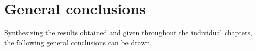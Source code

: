 %
%


\section{General conclusions}
\label{sec:05concl}

Synthesizing the results obtained and given throughout the individual chapters, the following general conclusions can be drawn.\\

